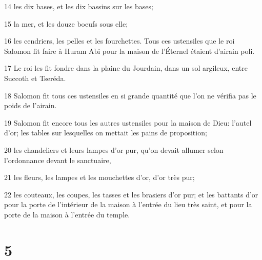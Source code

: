 \par 14 les dix bases, et les dix bassins sur les bases;
\par 15 la mer, et les douze boeufs sous elle;
\par 16 les cendriers, les pelles et les fourchettes. Tous ces ustensiles que le roi Salomon fit faire à Huram Abi pour la maison de l'Éternel étaient d'airain poli.
\par 17 Le roi les fit fondre dans la plaine du Jourdain, dans un sol argileux, entre Succoth et Tseréda.
\par 18 Salomon fit tous ces ustensiles en si grande quantité que l'on ne vérifia pas le poids de l'airain.
\par 19 Salomon fit encore tous les autres ustensiles pour la maison de Dieu: l'autel d'or; les tables sur lesquelles on mettait les pains de proposition;
\par 20 les chandeliers et leurs lampes d'or pur, qu'on devait allumer selon l'ordonnance devant le sanctuaire,
\par 21 les fleurs, les lampes et les mouchettes d'or, d'or très pur;
\par 22 les couteaux, les coupes, les tasses et les brasiers d'or pur; et les battants d'or pour la porte de l'intérieur de la maison à l'entrée du lieu très saint, et pour la porte de la maison à l'entrée du temple.

\chapter{5}

